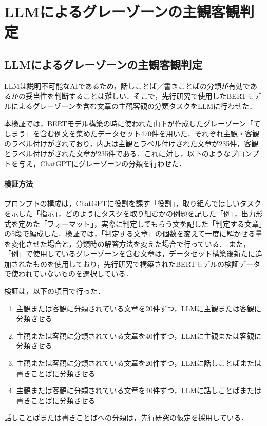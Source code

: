 \chapter{LLMによるグレーゾーンの主観客観判定 \label{c6}}


\section{LLMによるグレーゾーンの主観客観判定 \label{c6s2}}
LLMは説明不可能なAIであるため，話しことば／書きことばの分類が有効であるかの妥当性を判断することは難しい．そこで，先行研究で使用したBERTモデルによるグレーゾーンを含む文章の主観客観の分類タスクをLLMに行わせた．

本検証では，BERTモデル構築の時に使われた山下が作成したグレーゾーン「てしまう」を含む例文を集めたデータセット470件を用いた．それぞれ主観・客観のラベル付けがされており，内訳は主観とラベル付けされた文章が235件，客観とラベル付けがされた文章が235件である．これに対し，以下のようなプロンプトを与え，ChatGPTにグレーゾーンの分類を行わせた．



\subsubsection{検証方法}
プロンプトの構成は，ChatGPTに役割を課す「役割」，取り組んでほしいタスクを示した「指示」，どのようにタスクを取り組むかの例題を記した「例」，出力形式を定めた「フォーマット」，実際に判定してもらう文を記した「判定する文章」の5段で編成した．検証では，「判定する文章」の個数を変えて一度に解かせる量を変化させた場合と，分類時の解答方法を変えた場合で行っている．
また，「例」で使用しているグレーゾーンを含む文章は，データセット構築後新たに追加されたものを使用しており，先行研究\cite{ai-checker}で構築されたBERTモデルの検証データで使われていないものを選択している．



検証は，以下の項目で行った．
\begin{enumerate}
    \item 主観または客観に分類されている文章を20件ずつ，LLMに主観または客観に分類させる
    \item 主観または客観に分類されている文章を40件ずつ，LLMに主観または客観に分類させる
    \item 主観または客観に分類されている文章を20件ずつ，LLMに話しことばまたは書きことばに分類させる
    \item 主観または客観に分類されている文章を40件ずつ，LLMに話しことばまたは書きことばに分類させる
\end{enumerate}
話しことばまたは書きことばへの分類は，先行研究\cite{checker}の仮定を採用している．

